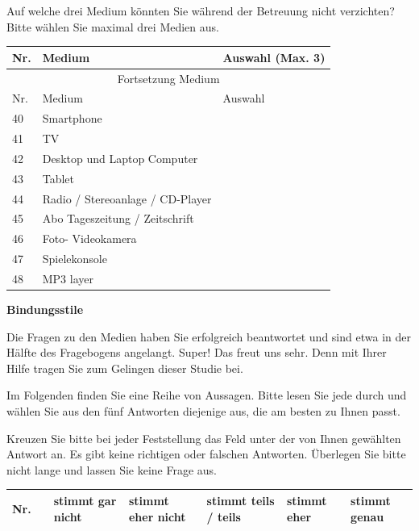 \begin{flushleft}
Auf welche drei Medium könnten Sie während der Betreuung nicht verzichten? Bitte wählen Sie maximal drei Medien aus.

\begin{longtable}[c]{ |p{1em}|p{18em}|p{10em}|} 
  \hline
  Nr. & Medium & Auswahl (Max. 3) \\
  \hline
  \endfirsthead
 
  \hline
  \multicolumn{3}{|c|}{ Fortsetzung Medium}\\
  \hline
    Nr. & Medium & Auswahl \\
  \hline
  \endhead
 
  \hline
  \endfoot
 
  \hline\hline
  \endlastfoot
  
  
  40 & Smartphone & \\
  41 & TV &\\
  42 & Desktop und Laptop Computer &\\
  43 & Tablet &\\
  44 & Radio / Stereoanlage / CD-Player &\\
  45 & Abo Tageszeitung / Zeitschrift &\\
  46 & Foto- Videokamera &\\
  47 & Spielekonsole &\\
  48 & MP3 layer &\\
\end{longtable}

\textbf{Bindungsstile}

Die Fragen zu den Medien haben Sie erfolgreich beantwortet und sind etwa in der Hälfte des Fragebogens angelangt. Super! Das freut uns sehr. Denn mit Ihrer Hilfe tragen Sie zum Gelingen dieser Studie bei.

\vspace{2mm}
Im Folgenden finden Sie eine Reihe von Aussagen. Bitte lesen Sie jede durch und wählen Sie aus den fünf Antworten diejenige aus, die am besten zu Ihnen passt.

\vspace{2mm}
Kreuzen Sie bitte bei jeder Feststellung das Feld unter der von Ihnen gewählten Antwort an. Es gibt keine richtigen oder falschen Antworten. Überlegen Sie bitte nicht lange und lassen Sie keine Frage aus.

\begin{longtable}[c]{ |p{1em}|p{14em}|p{3em}|p{3em}|p{3em}|p{3em}|p{3em}|} 
  \hline
  Nr. & & stimmt gar nicht & stimmt eher nicht & stimmt teils / teils & stimmt eher & stimmt genau \\
  \hline
  \endfirsthead
 

\end{longtable}
\end{flushleft}
